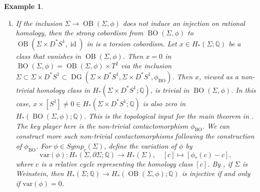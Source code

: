 \documentclass[11pt]{amsart}
\numberwithin{equation}{section}
\newtheorem{example}[theorem]{\textbf{Example}}
\def\Q{{\mathbb Q}}
\DeclareMathOperator{\Id}{id}
\DeclareMathOperator{\OB}{OB}
\DeclareMathOperator{\BO}{BO}
\DeclareMathOperator{\DG}{DG}
\begin{document}
\begin{example}
\begin{enumerate}
        
        More generally, in higher dimensions, let $M$ be the contact boundary of $\Sigma_{1,1}\times V$, where $\Sigma_{1,1}$ is the $2$-torus with one disk removed and $V$ is a $2n$-dimensional Weinstein domain such that $H_{n-1}(V;\Q)=0$ and $H_n(V;\Q)\ne 0$. Let $\phi\in Symp_c(\Sigma)$ be such that $\phi_*\ne \Id$ on $H_n(V;\Q)$. Then $M$ has two Weinstein fillings: $\Sigma_{1,1}\times V$ and $V_{\phi\vee \Id}$, which is a $V$-fibration over $\Sigma_{1,1}$ with monodromy around the two circles in $\Sigma_{1,1}$ given by $\phi$ and $\Id$, as in \cite{zhou2023note}. Note that the inclusion $V\subset S^1\times V \subset M$ induces an injection $H_n(V;\Q)\to H_n(M;\Q)$, since the composition $V \subset M \subset \Sigma_{1,1}\times V$ induces an injection on homology. By the exact sequence following \cite[Lemma 2.2]{zhou2023note}, we have $\dim H_n(V_{\phi\vee\Id};\Q)=\dim \ker(\phi_*-\Id)|_{H_n(V;\Q)}<\dim H_n(V;\Q)$, so we can find such a class $x\in H_n(M;\Q)$. It is easy to construct such $\phi$ from compositions of Dehn-Seidel twists, see \cite{zhou2023note}.
        \item\label{DG2} If the inclusion $\Sigma \to \OB(\Sigma,\phi)$ does not induce an injection on rational homology, then the strong cobordism from $\BO(\Sigma,\phi)$ to $\OB(\Sigma\times D^*S^1,\Id)$ in  is a torsion cobordism. Let $x\in H_*(\Sigma;\Q)$ be a class that vanishes in $\OB(\Sigma,\phi)$. Then $x=0$ in $\BO(\Sigma,\phi)=\OB(\Sigma,\phi)\times T^2$ via the inclusion $\Sigma\subset \Sigma \times D^*S^1 \subset \DG(\Sigma \times D^*S^1,\Sigma\times D^*S^1,\phi_{\BO})$. Then $x$, viewed as a non-trivial homology class in $H_*(\Sigma \times D^*S^1;\Q)$, is trivial in $\BO(\Sigma,\phi)$. In this case, $x\times [S^1] \ne 0 \in H_*(\Sigma\times D^*S^1;\Q)$ is also zero in $H_*(\BO(\Sigma,\phi);\Q)$. This is the topological input for the main theorem in \cite{BGM}. The key player here is the non-trivial contactomorphism $\phi_{\BO}$. We can construct more such non-trivial contactomorphisms following the construction of $\phi_{\BO}$. For $\phi \in Symp_c(\Sigma)$, define the variation of $\phi$ \cite[\S 2.4]{zbMATH07738054} by
        $$\mathrm{var}(\phi):H_*(\Sigma,\partial\Sigma;\Q)\to H_*(\Sigma), \quad [c]\mapsto [\phi_*(c)-c],$$
        where $c$ is a relative cycle representing the homology class $[c]$. By \cite[Lemma 2.10]{zbMATH07738054}, if $\Sigma$ is Weinstein, then $H_*(\Sigma;\Q)\to H_*(\OB(\Sigma,\phi);\Q)$ is injective if and only if $\mathrm{var}(\phi)=0$.
        

\end{enumerate}
\end{example}
\end{document}
